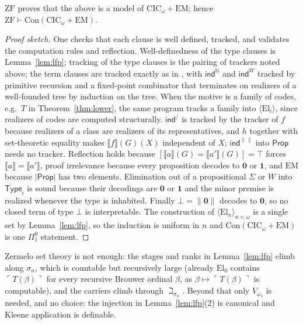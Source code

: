 \documentclass[10pt]{article}
\newcommand{\N}{\mathbb{N}}
\newcommand{\Prop}{\mathsf{Prop}}
\newcommand{\Type}{\mathsf{Type}}
\newcommand{\CIC}{\mathrm{CIC}}
\newcommand{\ZF}{\mathrm{ZF}}
\newcommand{\EM}{\mathrm{EM}}
\newcommand{\Con}{\mathrm{Con}}
\newcommand{\code}[1]{\ulcorner #1\urcorner}
\newcommand{\El}{\mathrm{El}}
\newcommand{\sem}[1]{\llbracket #1\rrbracket}
\begin{document}
\begin{theorem}\label{thm:main}
$\ZF$ proves that the above is a model of $\CIC_\omega+\EM$; hence
$\ZF\vdash\Con(\CIC_\omega+\EM)$.
\end{theorem}
\begin{proof}[Proof sketch]
One checks that each clause is well defined, tracked, and validates the
computation rules and reflection. Well-definedness of the type clauses is
Lemma~\ref{lem:lfp}; tracking of the type clauses is the pairing of
trackers noted above; the term clauses are tracked exactly as in
\cite[App.~B]{vdbergotten23}, with $\mathsf{ind}^\N$ and $\mathsf{ind}^W$
tracked by primitive recursion and a fixed-point combinator that terminates
on realizers of a well-founded tree by induction on the tree. When the
motive is a family of codes, e.g.\ $T$ in Theorem~\ref{thm:lower}, the
same program tracks a family into $\langle\El_i\rangle$, since realizers of
codes are computed structurally. $\mathsf{ind}^/$ is tracked by the tracker
of $f$ because realizers of a class are realizers of its representatives,
and $h$ together with set-theoretic equality makes $\sem f(G)(X)$
independent of $X$; $\mathsf{ind}^{\|\|}$ into $\Prop$ needs no tracker.
Reflection holds because $[\sem a(G)=\sem{a'}(G)]=\top$ forces
$\sem a=\sem{a'}$, proof irrelevance because every proposition decodes to
$\mathbf 0$ or $\mathbf 1$, and $\EM$ because $|\Prop|$ has two elements.
Elimination out of a propositional $\Sigma$ or $W$ into $\Type_i$ is sound
because their decodings are $\mathbf 0$ or $\mathbf 1$ and the minor
premise is realized whenever the type is inhabited. Finally
$\bot=\|\mathbf 0\|$ decodes to $\mathbf 0$, so no closed term of type
$\bot$ is interpretable. The construction of $\langle\El_n\rangle_{n<\omega}$
is a single set by Lemma~\ref{lem:lfp}, so the induction is uniform in $n$
and $\Con(\CIC_\omega+\EM)$ is one $\Pi^0_1$ statement.
\end{proof}

\begin{remark}
Zermelo set theory is not enough: the stages and ranks in
Lemma~\ref{lem:lfp} climb along $\sigma_n$, which is countable but
recursively large (already $\El_0$ contains $\code{T(\beta)}$ for every
recursive Brouwer ordinal $\beta$, as $\beta\mapsto\code{T(\beta)}$ is
computable), and the carriers climb through $\beth_{\sigma_n}$. Beyond that
only $V_{\omega_1}$ is needed, and no choice: the injection in
Lemma~\ref{lem:lfp}(2) is canonical and Kleene application is definable.
\end{remark}
\end{document}
